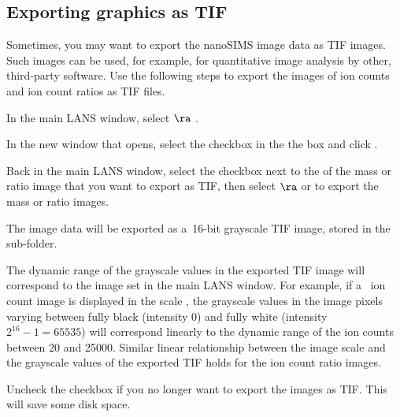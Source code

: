\subsection{Exporting graphics as TIF}
\setcounter{step}{0}

\goldbox{}
Sometimes, you may want to export the nanoSIMS image data as TIF images. Such images can be used, for example, for quantitative image analysis by other, third-party software.  Use the following steps to export the images of ion counts and ion count ratios as TIF files. 
\tcbe

\s In the main LANS window, select  $\ra$ .

\s In the new window that opens, select the  checkbox in the the  box and click .

\s Back in the main LANS window, select the  checkbox next to the  of the mass or ratio image that you want to export as TIF, then select  $\ra$  or  to export the mass or ratio images.

\nb\bul The image data will be exported as a~16-bit grayscale TIF image, stored in the  sub-folder. 

\nb\bul The dynamic range of the grayscale values in the exported TIF image will correspond to the image  set in the main LANS window. For example, if a~ ion count image is displayed in the scale , the grayscale values in the image pixels varying between fully black (intensity 0) and fully white (intensity $2^{16}-1=65535$) will correspond linearly to the dynamic range of the ion counts between 20 and 25000. Similar linear relationship between the image scale and the grayscale values of the exported TIF holds for the ion count ratio images.

\s Uncheck the  checkbox if you no longer want to export the images as TIF. This will save some disk space.
